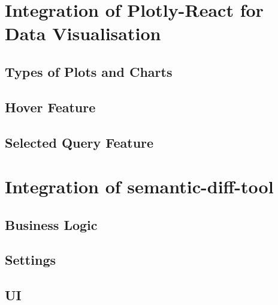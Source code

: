 \section{Integration of Plotly-React for Data Visualisation}
\subsection{Types of Plots and Charts}
\subsection{Hover Feature}
\subsection{Selected Query Feature}

\section{Integration of semantic-diff-tool}\label{sec:semantic-diff-integration}
\subsection{Business Logic}
\subsection{Settings}
\subsection{UI}